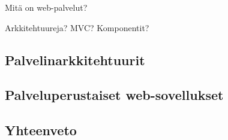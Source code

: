 Mitä on web-palvelut?

Arkkitehtuureja? MVC? Komponentit?


\subsection{Palvelinarkkitehtuurit}

\subsection{Palveluperustaiset web-sovellukset}

\subsection{Yhteenveto}
